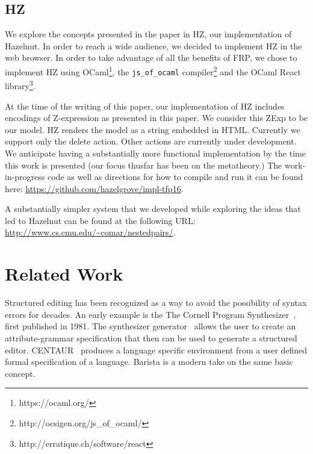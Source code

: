 \documentclass{llncs}
\begin{document}
\subsection{HZ}
We explore the concepts presented in the paper in HZ, our implementation of Hazelnut.
In order to reach a wide audience, we decided to implement HZ in the web browser.
In order to take advantage of all the benefits of FRP, we chose to implement HZ using OCaml\footnote{https://ocaml.org/}, the \texttt{js\_of\_ocaml} compiler\footnote{http://ocsigen.org/js\_of\_ocaml/} and the OCaml React library\footnote{http://erratique.ch/software/react}.

At the time of the writing of this paper, our implementation of HZ includes encodings of Z-expression as presented in this paper.
We consider this ZExp to be our model. 
HZ renders the model as a string embedded in HTML.
Currently we support only the delete action.  Other actions are currently under development. We anticipate having a substantially more functional implementation by the time this work is presented (our focus thusfar has been on the metatheory.) 
The work-in-progress code as well as directions for how to compile and run it can be found here: \url{https://github.com/hazelgrove/impl-tfp16}.

A substantially simpler system that we developed while exploring the ideas that led to Hazelnut can be found at the following URL:
\url{http://www.cs.cmu.edu/~comar/nestedpairs/}.

\section{Related Work}\label{sec:rw}

Structured editing has been recognized as a way to avoid the possibility of syntax errors for decades.  An early example is the
The Cornell Program Synthesizer~\cite{teitelbaum_cornell_1981}, first published in 1981.
The synthesizer generator~\cite{Reps:1984:SG:390010.808247} allows the user to create an attribute-grammar specification that then can be used to generate a structured editor.
CENTAUR~\cite{Borras:1988:CS:64140.65005} produces a language specific environment from a user defined formal specification of a language. Barista \cite{ko_barista:_2006} is a modern take on the same basic concept.%
\end{document}
